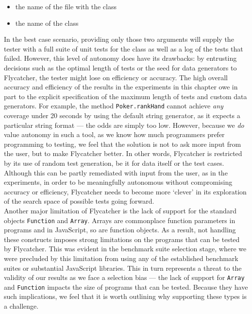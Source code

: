 \begin{itemize}
   \item the name of the file with the class
   \item the name of the class
\end{itemize}

In the best case scenario, providing only those two arguments will supply the tester with a full suite of unit tests for the class as well as a log of the tests that failed. However, this level of autonomy does have its drawbacks: by entrusting decisions such as the optimal length of tests or the seed for data generators to \textsf{Flycatcher}, the tester might lose on efficiency or accuracy. The high overall accuracy and efficiency of the results in the experiments in this chapter owe in part to the explicit specification of the maximum length of tests and custom data generators. For example, the method \texttt{Poker.rankHand} cannot achieve \emph{any} coverage under 20 seconds by using the default string generator, as it expects a particular string format --- the odds are simply too low. However, because we \emph{do} value autonomy in such a tool, as we know how much programmers prefer programming to testing, we feel that the solution is not to ask more input from the user, but to make \textsf{Flycatcher} better. In other words, \textsf{Flycatcher} is restricted by its use of random test generation, be it for data itself or the test cases. Although this can be partly remediated with input from the user, as in the experiments, in order to be meaningfully autonomous without compromising accuracy or efficiency, \textsf{Flycatcher} needs to become more `clever' in its exploration of the search space of possible tests going forward.\\

Another major limitation of \textsf{Flycatcher} is the lack of support for the standard objects \texttt{Function} and \texttt{Array}. Arrays are commonplace function parameters in programs and in JavaScript, so are function objects. As a result, not handling these constructs imposes strong limitations on the programs that can be tested by \textsf{Flycatcher}. This was evident in the benchmark suite selection stage, where we were precluded by this limitation from using any of the established benchmark suites or substantial JavaScript libraries. This in turn represents a threat to the validity of our results as we face a selection bias --- the lack of support for \texttt{Array} and \texttt{Function} impacts the size of programs that can be tested. Because they have such implications, we feel that it is worth outlining why supporting these types is a challenge.

